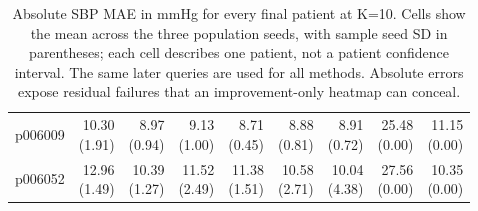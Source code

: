 \documentclass[11pt]{article}
\begin{document}
\begin{table}[!htbp]
\begin{tabular}{lrrrrrrrr}
p006009 & \shortstack{10.30\\(1.91)} & \shortstack{8.97\\(0.94)} & \shortstack{9.13\\(1.00)} & \shortstack{8.71\\(0.45)} & \shortstack{8.88\\(0.81)} & \shortstack{8.91\\(0.72)} & \shortstack{25.48\\(0.00)} & \shortstack{11.15\\(0.00)}\\
p006052 & \shortstack{12.96\\(1.49)} & \shortstack{10.39\\(1.27)} & \shortstack{11.52\\(2.49)} & \shortstack{11.38\\(1.51)} & \shortstack{10.58\\(2.71)} & \shortstack{10.04\\(4.38)} & \shortstack{27.56\\(0.00)} & \shortstack{10.35\\(0.00)}\\
\bottomrule\end{tabular}
\caption{Absolute SBP MAE in mmHg for every final patient at K=10. Cells show the mean across the three population seeds, with sample seed SD in parentheses; each cell describes one patient, not a patient confidence interval. The same later queries are used for all methods. Absolute errors expose residual failures that an improvement-only heatmap can conceal.}\end{table}
\end{document}
